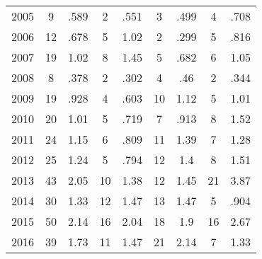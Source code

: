 \begin{table}[htbp]
\begin{tabular}{l*{8}{c}}
2005      &        9&     .589&        2&     .551&        3&     .499&        4&     .708\\
2006      &       12&     .678&        5&     1.02&        2&     .299&        5&     .816\\
2007      &       19&     1.02&        8&     1.45&        5&     .682&        6&     1.05\\
2008      &        8&     .378&        2&     .302&        4&      .46&        2&     .344\\
2009      &       19&     .928&        4&     .603&       10&     1.12&        5&     1.01\\
2010      &       20&     1.01&        5&     .719&        7&     .913&        8&     1.52\\
2011      &       24&     1.15&        6&     .809&       11&     1.39&        7&     1.28\\
2012      &       25&     1.24&        5&     .794&       12&      1.4&        8&     1.51\\
2013      &       43&     2.05&       10&     1.38&       12&     1.45&       21&     3.87\\
2014      &       30&     1.33&       12&     1.47&       13&     1.47&        5&     .904\\
2015      &       50&     2.14&       16&     2.04&       18&      1.9&       16&     2.67\\
2016      &       39&     1.73&       11&     1.47&       21&     2.14&        7&     1.33\\
\hline\hline
\end{tabular}
\end{table}
